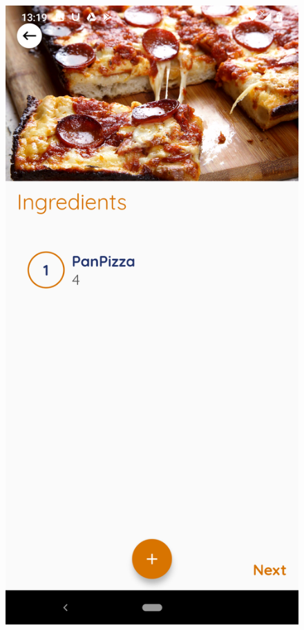 \documentclass{article}
\begin{document}
\begin{figure}[h!]
    \includegraphics[scale=0.1]{Images/Panpizza_ingre.jpg}

\end{figure}
\end{document}
